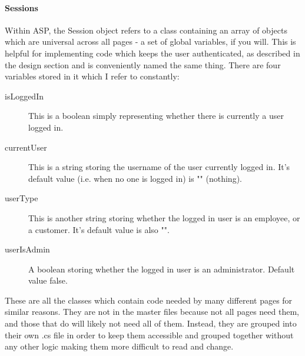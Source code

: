 ﻿\documentclass{article}
\begin{document}
    \paragraph{Sessions}
    Within ASP, the Session object refers to a class containing an array of objects which are universal across all pages - a set of global variables, if you will.
    This is helpful for implementing code which keeps the user authenticated, as described in the design section and is conveniently named the same thing.
    There are four variables stored in it which I refer to constantly:
    \begin{description}
        \item[isLoggedIn] This is a boolean simply representing whether there is currently a user logged in.
        \item[currentUser] This is a string storing the username of the user currently logged in.
        It's default value (i.e. when no one is logged in) is "" (nothing).
        \item[userType] This is another string storing whether the logged in user is an employee, or a customer.
        It's default value is also "".
        \item[userIsAdmin] A boolean storing whether the logged in user is an administrator.
        Default value false.
    \end{description}
    \newpage
    These are all the classes which contain code needed by many different pages for similar reasons.
    They are not in the master files because not all pages need them, and those that do will likely not need all of them.
    Instead, they are grouped into their own .cs file in order to keep them accessible and grouped together without any other logic making them more difficult to read and change.
    \newpage
\end{document}
